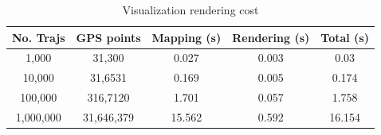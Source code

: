 %
%

\begin{table}
	\centering
	\small
	\caption{Visualization rendering cost}
	\begin{tabular}{|c|c|c|c|c|} \hline
		No. Trajs & GPS points & Mapping (s) & Rendering (s) & Total (s)\\ \hline
		1,000& 31,300 & 0.027 & 0.003 & 0.03 \\ \hline
		10,000& 31,6531 & 0.169 & 0.005 & 0.174\\ \hline
		100,000& 316,7120 & 1.701 & 0.057 & 1.758 \\ \hline
		1,000,000& 31,646,379 & 15.562 & 0.592 & 16.154 \\ \hline
	\end{tabular}	\label{tab:gpu}
\end{table}
